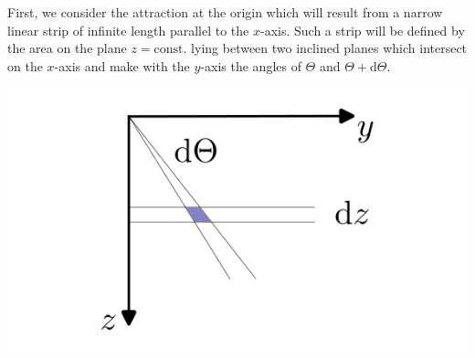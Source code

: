 \documentclass[
  a4paper,
  DIV=11,
  numbers=noendperiod]{scrreprt}
\begin{document}
First, we consider the attraction at the origin which will result from a
narrow linear strip of infinite length parallel to the \(x\)-axis. Such
a strip will be defined by the area on the plane \(z=\mathrm{const.}\)
lying between two inclined planes which intersect on the \(x\)-axis and
make with the \(y\)-axis the angles of \(\Theta\) and
\(\Theta + \mathrm{d}\Theta\).

\includegraphics{images/hubbert_02.png}
\end{document}
